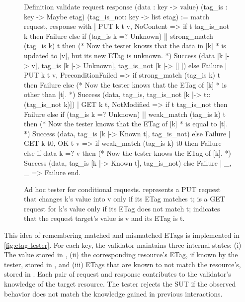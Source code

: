 \begin{figure}
\begin{coq}
  Definition validate request response
             (data      : key -> value)
             (tag_is    : key -> Maybe etag)
             (tag_is_not: key -> list etag) :=
    match request, response with
    | PUT k t v, NoContent => 
      if t \in tag_is_not k then Failure
      else if (tag_is k =? Unknown) || strong_match (tag_is k) t
      then (* Now the tester knows that the data in [k]
            * is updated to [v], but its new ETag is unknown. *)
        Success (data       [k |-> v],
                 tag_is     [k |-> Unknown],
                 tag_is_not [k |-> [] ])
      else Failure
    | PUT k t v, PreconditionFailed =>
      if strong_match (tag_is k) t then Failure
      else (* Now the tester knows that the ETag of [k]
            * is other than [t]. *)
        Success (data, tag_is, tag_is_not [k |-> t::(tag_is_not k)])
    | GET k t, NotModified =>
      if t \in tag_is_not then Failure
      else if (tag_is k =? Unknown) || weak_match (tag_is k) t
      then (* Now the tester knows that the ETag of [k]
            * is equal to [t]. *)
        Success (data, tag_is [k |-> Known t], tag_is_not)
      else Failure
    | GET k t0, OK t v =>
      if weak_match (tag_is k) t0 then Failure
      else if data k =? v
      then (* Now the tester knows the ETag of [k]. *)
        Success (data, tag_is [k |-> Known t], tag_is_not)
      else Failure
    | _, _ => Failure
    end.
\end{coq}
  \caption[Ad hoc tester for \http conditional requests.]{Ad hoc tester for
    \http conditional requests.   represents a PUT request that
    changes \ilc k's value into \ilc v only if its ETag matches \ilc t;  is a GET request for \ilc k's value only if its ETag does not match
    \ilc t;  indicates that the request target's value is \ilc v and
    its ETag is \ilc t.}
  \label{fig:etag-tester}
\end{figure}

This idea of remembering matched and mismatched ETags is implemented in
\autoref{fig:etag-tester}.  For each key, the validator maintains three internal
states: (i) The value stored in , (ii) the corresponding resource's
ETag, if known by the tester, stored in , and (iii) ETags that are
known to not match the resource's, stored in .  Each pair of
request and response contributes to the validator's knowledge of the target
resource.  The tester rejects the SUT if the observed behavior does not match
the knowledge gained in previous interactions.

